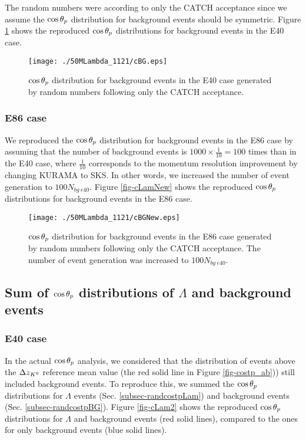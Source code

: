 The random numbers were according to only the CATCH acceptance since we assume the $\cos{\theta_p}$ distribution for background events should be symmetric. Figure \ref{fig-cBG} shows the reproduced $\cos{\theta_p}$ distributions for background events in the E40 case. 

\begin{figure}[h]
  \centering
  \texttt{[image: ./50MLambda\_1121/cBG.eps]}
  \caption{$\cos{\theta_p}$ distribution for background events in the E40 case generated by random numbers following only the CATCH acceptance. %
  }
  \label{fig-cBG}
\end{figure}

\subsubsection{E86 case}
We reproduced the $\cos{\theta_p}$ distribution for background events in the E86 case by assuming that the number of background events is $1000\times\frac{1}{10}=100$ times than in the E40 case, where $\frac{1}{10}$ corresponds to the momentum resolution improvement by changing KURAMA to SKS. In other words, we increased the number of event generation to $100 N_{bg\ e40}$. Figure \ref{fig-cLamNew} shows the reproduced $\cos{\theta_p}$ distributions for background events in the E86 case.

\begin{figure}[h]
  \centering
  \texttt{[image: ./50MLambda\_1121/cBGNew.eps]}
  \caption{$\cos{\theta_p}$ distribution for background events in the E86 case generated by random numbers following only the CATCH acceptance. The number of event generation was increased to $100 N_{bg\ e40}$.}
  \label{fig-cBGNew}
\end{figure}


\clearpage
\subsection{Sum of $\cos{\theta_p}$ distributions of $\Lambda$ and background events}
\subsubsection{E40 case}
\label{subsubsec-sume40}
In the actual $\cos{\theta_p}$ analysis, we considered that the distribution of events above the $\Delta z_{K^{0}}$ reference mean value (the red solid line in Figure \ref{fig-costp_ab})) still included background events. To reproduce this, we summed the $\cos{\theta_p}$ distributions for $\Lambda$ events (Sec. \ref{subsec-randcostpLam}) and background events (Sec. \ref{subsec-randcostpBG}). Figure \ref{fig-cLam2} shows the reproduced $\cos{\theta_p}$ distributions for $\Lambda$ and background events (red solid lines), compared to the ones for only background events (blue solid lines). 

